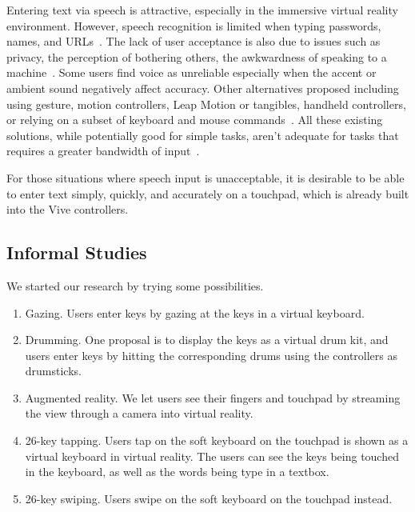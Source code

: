 Entering text via speech is attractive, especially in the immersive virtual reality environment.   However, speech recognition is limited when typing passwords, names, and URLs~\cite{TODO}. 
The lack of user acceptance is also due to issues such as privacy, the perception of bothering others, the awkwardness of speaking to a machine~\cite{sawhney2000nomadic}.
Some users find voice as unreliable especially when the accent or ambient sound negatively affect accuracy.
Other alternatives proposed including using gesture, motion controllers, Leap Motion or tangibles, handheld controllers, or relying on a subset of keyboard and mouse commands~\cite{billinghurst1999collaborative}.
All these existing solutions, while potentially good for simple tasks, aren't adequate for tasks that requires a greater bandwidth of input~\cite{McGill:2015:DRO:2702123.2702382}.

For those situations where speech input is unacceptable, it is desirable to be able to enter text simply, quickly, and accurately on a touchpad, which is already built into the Vive controllers.   

\subsection{Informal Studies}
We started our research by trying some  possibilities.
\begin{enumerate}
\item
Gazing.  Users enter keys by gazing at the keys in a virtual keyboard. 

\item

Drumming.  One proposal is to display the keys as a virtual drum kit, and users enter keys by hitting the corresponding drums using the controllers as drumsticks. 

\item
Augmented reality.  We let users see their fingers and touchpad by streaming the view through a camera into virtual reality.  

\item
26-key tapping.  Users tap on the soft keyboard on the touchpad is shown as a virtual keyboard in virtual reality.   The users can see the keys being touched in the keyboard, as well as the words being type in a textbox.

\item
26-key swiping.  Users swipe on the soft keyboard on the touchpad instead.  
\end{enumerate}

